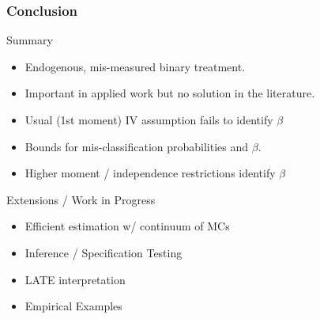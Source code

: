 \documentclass{beamer}
\begin{document}
\begin{frame}
  \frametitle{Conclusion}

  \begin{block}{Summary}
  \begin{itemize}
    \item Endogenous, mis-measured binary treatment.
    \item Important in applied work but no solution in the literature.
      \item Usual (1st moment) IV assumption fails to identify $\beta$
      \item Bounds for mis-classification probabilities and $\beta$.
      \item Higher moment / independence restrictions identify $\beta$
   \end{itemize}
  \end{block}

  \begin{block}{Extensions / Work in Progress}
    \begin{itemize}
      \item Efficient estimation w/ continuum of MCs
        \item Inference / Specification Testing
      \item LATE interpretation
      \item Empirical Examples
    \end{itemize}
  \end{block}
\end{frame}
\appendix
\end{document}

